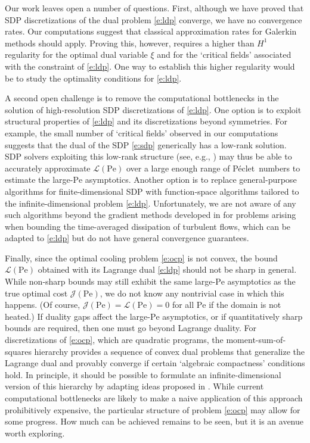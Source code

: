 \documentclass[a4paper, 10pt]{amsart}
\numberwithin{equation}{section}
\theoremstyle{plain}
\theoremstyle{definition}
\theoremstyle{remark}
\newcommand{\Pe}{\mathrm{Pe}}
\newcommand{\ocpval}{\mathcal{J}}
\newcommand{\lb}{\mathcal{L}}
\newcommand{\Peclet}{P\'eclet}
\begin{document}
Our work leaves open a number of questions. First, although we have proved that SDP discretizations of the dual problem \cref{e:ldp} converge, we have no convergence rates. Our computations suggest that classical approximation rates for Galerkin methods should apply. Proving this, however, requires a higher than $H^1$ regularity for the optimal dual variable $\xi$ and for the `critical fields' associated with the constraint of \cref{e:ldp}. One way to establish this higher regularity would be to study the optimality conditions for \cref{e:ldp}. 

A second open challenge is to remove the computational bottlenecks in the solution of high-resolution SDP discretizations of \cref{e:ldp}.
One option is to exploit structural properties of \cref{e:ldp} and its discretizations beyond symmetries. For example, the small number of `critical fields' observed in our computations suggests that the dual of the SDP \cref{e:sdp} generically has a low-rank solution. SDP solvers exploiting this low-rank structure (see, e.g., \cite{Burer2003,Burer2006,Bellavia2021,Habibi2023,Souto2022,Monteiro2026}) may thus be able to accurately approximate $\lb(\Pe)$ over a large enough range of \Peclet\ numbers to estimate the large-$\Pe$ asymptotics. Another option is to replace general-purpose algorithms for finite-dimensional SDP with function-space algorithms tailored to the infinite-dimensional problem \cref{e:ldp}. Unfortunately, we are not aware of any such algorithms beyond the gradient methods developed in \cite{Wen2013,Wen2015,Ding2019,Wen2022} for problems arising when bounding the time-averaged dissipation of turbulent flows, which can be adapted to \cref{e:ldp} but do not have general convergence guarantees. 

Finally, since the optimal cooling problem \cref{e:ocp} is not convex, the bound $\lb(\Pe)$ obtained with its Lagrange dual \cref{e:ldp} should not be sharp in general. While non-sharp bounds may still exhibit the same large-$\Pe$ asymptotics as the true optimal cost $\ocpval(\Pe)$, we do not know any nontrivial case in which this happens. (Of course, $\ocpval(\Pe)=\lb(\Pe)=0$ for all $\Pe$ if the domain is not heated.) If duality gaps affect the large-$\Pe$ asymptotics, or if quantitatively sharp bounds are required, then one must go beyond Lagrange duality. For discretizations of \cref{e:ocp}, which are quadratic programs, the moment-sum-of-squares hierarchy \cite{Laurent2009,Lasserre2010,Lasserre2024} provides a sequence of convex dual problems that generalize the Lagrange dual and provably converge if certain `algebraic compactness' conditions hold. In principle, it should be possible to formulate an infinite-dimensional version of this hierarchy by adapting ideas proposed in \cite{Goulart2012,Chernyshenko2014a,Goluskin2019,HenrionRudi2025,henrion2023infmom}. While current computational bottlenecks are likely to make a naive application of this approach prohibitively expensive, the particular structure of problem \cref{e:ocp} may allow for some progress. How much can be achieved remains to be seen, but it is an avenue worth exploring.
\end{document}
